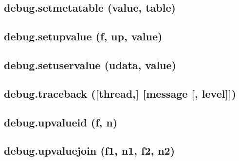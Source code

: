 \documentclass[12pt]{article}
\begin{document}
\subsection{debug.setmetatable (value, table)}

\subsection{debug.setupvalue (f, up, value)}

\subsection{debug.setuservalue (udata, value)}

\subsection{debug.traceback ([thread,] [message [, level]])}

\subsection{debug.upvalueid (f, n)}

\subsection{debug.upvaluejoin (f1, n1, f2, n2)}
\end{document}
